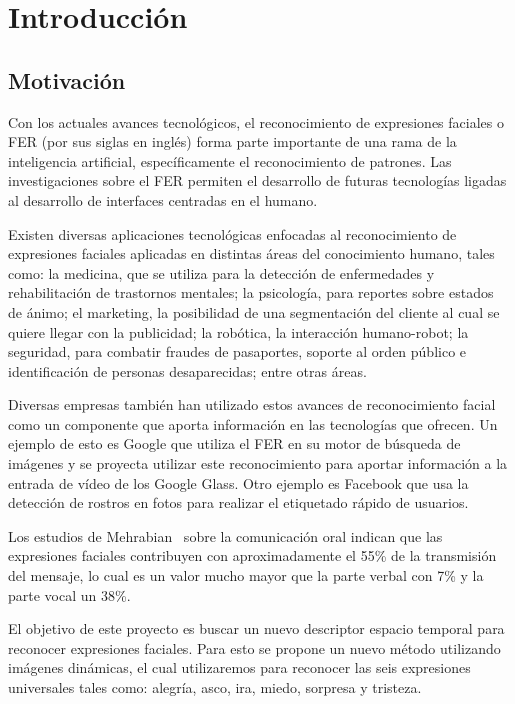 \chapter[Introducción]{Introducción}
\label{ch:intro}

\section{Motivación}
\label{sec:motivacion}
Con los actuales avances tecnológicos, el reconocimiento de expresiones faciales o FER (por sus siglas en inglés) forma parte importante de una rama de la inteligencia artificial, específicamente el reconocimiento de patrones.  Las investigaciones sobre el FER permiten el desarrollo de futuras tecnologías ligadas al desarrollo de interfaces centradas en el humano. 

Existen diversas aplicaciones tecnológicas enfocadas al reconocimiento de expresiones faciales aplicadas en distintas áreas del conocimiento humano, tales como:  la medicina, que se utiliza para la detección de enfermedades y rehabilitación de trastornos mentales; la psicología, para reportes sobre estados de ánimo; el marketing, la posibilidad de una segmentación del cliente al cual se quiere llegar con la publicidad; la robótica, la interacción humano-robot; la seguridad, para combatir fraudes de pasaportes, soporte al orden público e identificación de personas desaparecidas; entre otras áreas.

Diversas empresas también han utilizado estos avances de reconocimiento facial como un componente que aporta información en las tecnologías que ofrecen. Un ejemplo de esto es  Google que utiliza el FER en su motor de búsqueda de imágenes y se proyecta utilizar este reconocimiento para aportar información a la entrada de vídeo de los Google Glass. Otro ejemplo es Facebook que usa la detección de rostros en  fotos para realizar el etiquetado rápido de usuarios.

Los estudios de Mehrabian~\cite{Mehrabian1968} sobre la comunicación oral indican que las expresiones faciales contribuyen con aproximadamente el 55\% de la transmisión del mensaje, lo cual es un valor mucho mayor que la parte verbal con 7\% y la parte vocal un 38\%.

El objetivo de este proyecto es buscar un nuevo descriptor espacio temporal para reconocer expresiones faciales. Para esto se propone un nuevo método utilizando imágenes dinámicas, el cual utilizaremos para reconocer las seis expresiones universales tales como: alegría, asco, ira, miedo, sorpresa y tristeza.

